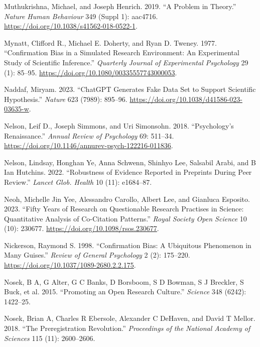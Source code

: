 \documentclass[
  letterpaper,
  DIV=11,
  numbers=noendperiod]{scrreprt}
\newlength{\cslhangindent}
\newenvironment{CSLReferences}[2] %
 {\begin{list}{}{%
  \setlength{\itemindent}{0pt}
  \setlength{\leftmargin}{0pt}
  \setlength{\parsep}{0pt}
  \ifodd #1
   \setlength{\leftmargin}{\cslhangindent}
   \setlength{\itemindent}{-1\cslhangindent}
  \fi
  \setlength{\itemsep}{#2\baselineskip}}}
 {\end{list}}
\begin{document}
\begin{CSLReferences}{1}{0}
Muthukrishna, Michael, and Joseph Henrich. 2019. {``A Problem in
Theory.''} \emph{Nature Human Behaviour} 349 (Suppl 1): aac4716.
\url{https://doi.org/10.1038/s41562-018-0522-1}.

Mynatt, Clifford R., Michael E. Doherty, and Ryan D. Tweney. 1977.
{``Confirmation Bias in a Simulated Research Environment: An
Experimental Study of Scientific Inference.''} \emph{Quarterly Journal
of Experimental Psychology} 29 (1): 85--95.
\url{https://doi.org/10.1080/00335557743000053}.

Naddaf, Miryam. 2023. {``ChatGPT Generates Fake Data Set to Support
Scientific Hypothesis.''} \emph{Nature} 623 (7989): 895--96.
\url{https://doi.org/10.1038/d41586-023-03635-w}.

Nelson, Leif D., Joseph Simmons, and Uri Simonsohn. 2018.
{``Psychology's Renaissance.''} \emph{Annual Review of Psychology} 69:
511--34. \url{https://doi.org/10.1146/annurev-psych-122216-011836}.

Nelson, Lindsay, Honghan Ye, Anna Schwenn, Shinhyo Lee, Salsabil Arabi,
and B Ian Hutchins. 2022. {``Robustness of Evidence Reported in
Preprints During Peer Review.''} \emph{Lancet Glob. Health} 10 (11):
e1684--87.

Neoh, Michelle Jin Yee, Alessandro Carollo, Albert Lee, and Gianluca
Esposito. 2023. {``Fifty Years of Research on Questionable Research
Practises in Science: Quantitative Analysis of Co-Citation Patterns.''}
\emph{Royal Society Open Science} 10 (10): 230677.
\url{https://doi.org/10.1098/rsos.230677}.

Nickerson, Raymond S. 1998. {``Confirmation Bias: A Ubiquitous
Phenomenon in Many Guises.''} \emph{Review of General Psychology} 2 (2):
175--220. \url{https://doi.org/10.1037/1089-2680.2.2.175}.

Nosek, B A, G Alter, G C Banks, D Borsboom, S D Bowman, S J Breckler, S
Buck, et al. 2015. {``Promoting an Open Research Culture.''}
\emph{Science} 348 (6242): 1422--25.

Nosek, Brian A, Charles R Ebersole, Alexander C DeHaven, and David T
Mellor. 2018. {``The Preregistration Revolution.''} \emph{Proceedings of
the National Academy of Sciences} 115 (11): 2600--2606.


\end{CSLReferences}
\end{document}
